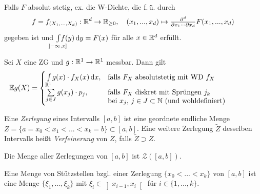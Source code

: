 \documentclass{cheat-sheet}
\newcommand{\E}{\mathbb{E}} %
\begin{document}
\begin{bem}
  Falls $F$ absolut stetig, ex. die W-Dichte, die f.\,ü. durch
  \[ f = f_{(X_1, ..., X_d)} : \mathbb{R}^d \to \mathbb{R}_{\geq 0}, \quad (x_1, ..., x_d) \mapsto \tfrac{\partial^d}{\partial x_1 \cdots \partial x_d} F(x_1, ..., x_d) \]
  gegeben ist und $\Int{\mathclap{\left] -\infty, x \right]}}{}{f(y)}{y} = F(x)$ für alle $x \in \mathbb{R}^d$ erfüllt.
\end{bem}


\begin{satz}
  Sei $X$ eine ZG und $g : \mathbb{R}^1 \to \mathbb{R}^1$ messbar. Dann gilt
  \[ \E g(X) = \begin{cases}
    \Int{\R^1}{}{g(x) \cdot f_X(x)}{x}, & \text{falls $F_X$ absolutstetig mit WD $f_X$} \\
    \sum_{j \in J} g(x_j) \cdot p_j, & \parbox[t]{.6\textwidth}{falls $F_X$ diskret mit Sprüngen $j_k$ \\ bei $x_j$, $j \in J \subset \N$ (und wohldefiniert)}
  \end{cases} \]
\end{satz}



\begin{defn}
  Eine \emph{Zerlegung} eines Intervalls $[a, b]$ ist eine geordnete endliche Menge $Z = \{ a = x_0 < x_1 < ... < x_k = b\} \subset [a, b]$. Eine weitere Zerlegung $\widetilde{Z}$ desselben Intervalls heißt \emph{Verfeinerung} von $Z$, falls $\widetilde{Z} \supset Z$.
\end{defn}

\begin{nota}
  Die Menge aller Zerlegungen von $[a, b]$ ist $\mathcal{Z}([a, b])$.
\end{nota}

\begin{defn}
  Eine Menge von Stützstellen bzgl. einer Zerlegung $\{ x_0 < ... < x_k \}$ von $\left[ a, b \right]$ ist eine Menge $\{ \xi_1, ..., \xi_k \}$ mit $\xi_i \in \left] x_{i{-}1}, x_i \right[$ für $i \in \{ 1, ..., k \}$.
\end{defn}
\end{document}
